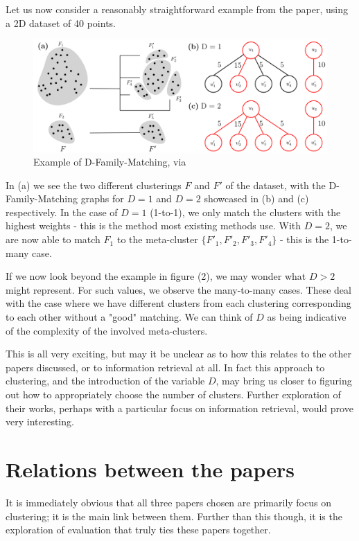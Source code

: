 \documentclass[sigconf,authorversion,nonacm]{acmart}
\begin{document}
Let us now consider a reasonably straightforward example from the paper, using a 2D dataset of 40 points.
\begin{figure}[H] \centering \includegraphics[width=\linewidth]{dfamilymatching.png} \caption{Example of
D-Family-Matching, via \cite{Cazals2019}} \end{figure} In (a) we see the two different clusterings $F$ and $F'$ of the
dataset, with the D-Family-Matching graphs for $D=1$ and $D=2$ showcased in (b) and (c) respectively. In the case of
$D=1$ (1-to-1), we only match the clusters with the highest weights - this is the method most existing methods use. With
$D=2$, we are now able to match $F_1$ to the meta-cluster $\{F'_1, F'_2, F'_3, F'_4\}$ - this is the 1-to-many case.

If we now look beyond the example in figure (2), we may wonder what $D>2$ might represent. For such values, we observe
the many-to-many cases. These deal with the case where we have different clusters from each clustering corresponding to
each other without a "good" matching. We can think of $D$ as being indicative of the complexity of the involved
meta-clusters.

This is all very exciting, but may it be unclear as to how this relates to the other papers discussed, or to information
retrieval at all. In fact this approach to clustering, and the introduction of the variable $D$, may bring us closer to
figuring out how to appropriately choose the number of clusters. Further exploration of their works, perhaps with a
particular focus on information retrieval, would prove very interesting. \section{Relations between the papers} It is
immediately obvious that all three papers chosen are primarily focus on clustering; it is the main link between them.
Further than this though, it is the exploration of evaluation that truly ties these papers together.
\end{document}
